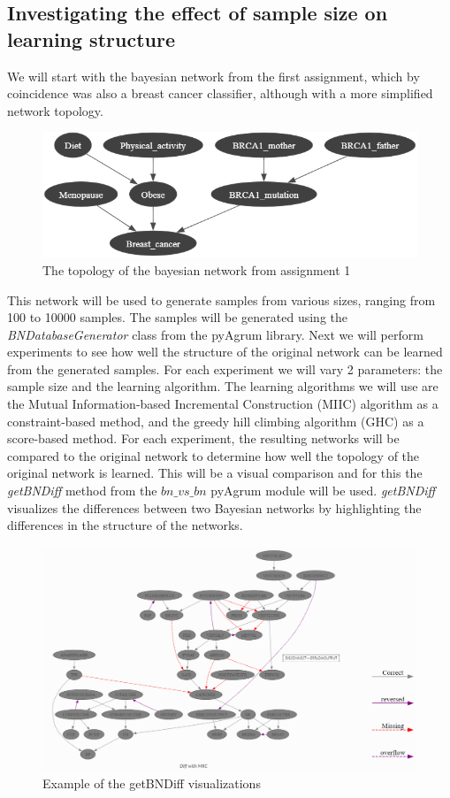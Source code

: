 \documentclass{article}
\begin{document}
\subsection{Investigating the effect of sample size on learning structure}
We will start with the bayesian network from the first assignment, which by coincidence was also a breast cancer classifier, although with a more simplified network topology.
\begin{figure}[H]
    \centering
    \includegraphics[width=\textwidth]{../figures/Assignment1_network_topology.png}
    \caption{The topology of the bayesian network from assignment 1}
    \label{fig:topology_assingment1}
\end{figure}
This network will be used to generate samples from various sizes, ranging from 100 to 10000 samples. The samples will be generated using the \textit{BNDatabaseGenerator} class from the pyAgrum library.
Next we will perform experiments to see how well the structure of the original network can be learned from the generated samples. For each experiment we will vary 2 parameters: the sample size and the learning algorithm.
The learning algorithms we will use are the Mutual Information-based Incremental Construction (MIIC) algorithm as a constraint-based method, and the greedy hill climbing algorithm (GHC) as a score-based method.
For each experiment, the resulting networks will be compared to the original network to determine how well the topology of the original network is learned. 
This will be a visual comparison and for this the \textit{getBNDiff} method from the \textit{$bn\_vs\_bn$} pyAgrum module will be used.
\textit{getBNDiff} visualizes the differences between two Bayesian networks by highlighting the differences in the structure of the networks.
\begin{figure}[H]
    \centering
    \includegraphics[width=\textwidth]{../figures/getBNDiff_example.png}
    \caption{Example of the getBNDiff visualizations}
    \label{fig:getbndiff}
\end{figure}
\end{document}
